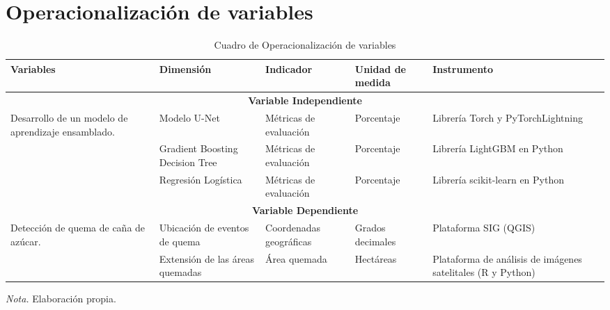 \section{Operacionalización de variables}
\begin{table}[H]
    \centering
    \caption{Cuadro de Operacionalización de variables}
    \label{tab:operacionalizacion}
    \begin{tabular}{m{3cm}m{3cm}m{2.5cm}m{2cm}m{3.9cm}}
        \hline
        \textbf{Variables} & \textbf{Dimensión} & \textbf{Indicador} & \textbf{Unidad de medida} & \textbf{Instrumento} \\
        \hline
        \multicolumn{5}{c}{\textbf{Variable Independiente}} \\
        \hline
        \multirow{6.25}{3.5cm}{Desarrollo de un modelo de aprendizaje ensamblado.} & Modelo U-Net & Métricas de evaluación & Porcentaje & Librería Torch y PyTorchLightning \\
        & Gradient Boosting Decision Tree & Métricas de evaluación & Porcentaje & Librería LightGBM en Python \\
        & Regresión Logística & Métricas de evaluación & Porcentaje & Librería scikit-learn en Python \\
        \hline
        \multicolumn{5}{c}{\textbf{Variable Dependiente}} \\
        \hline
        \multirow{4}{3.5cm}{Detección de quema de caña de azúcar.} & Ubicación de eventos de quema & Coordenadas geográficas & Grados decimales & Plataforma SIG (QGIS) \\
        & Extensión de las áreas quemadas & Área quemada & Hectáreas & Plataforma de análisis de imágenes satelitales (R y Python) \\
        \hline
    \end{tabular}
    \begin{flushleft}
        \textit{Nota.} Elaboración propia.
        \vspace{-\baselineskip}
    \end{flushleft}
\end{table}


